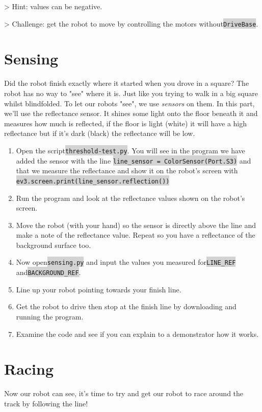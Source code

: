 \documentclass[12pt,a4paper]{article}
\newcommand{\code}[1]{\colorbox{lightgray}{\texttt{#1}}}
\begin{document}
> Hint: values can be negative.

> Challenge: get the robot to move by controlling the motors without\code{DriveBase}.

\section{ Sensing}

Did the robot finish exactly where it started when you drove in a square? The robot has no way to "see" where it is. Just like you trying to walk in a big square whilst blindfolded. To let our robots "see", we use \emph{sensors} on them. In this part, we'll use the reflectance sensor. It shines some light onto the floor beneath it and measures how much is reflected, if the floor is light (white) it will have a high reflectance but if it's dark (black) the reflectance will be low.

\begin{enumerate}
    \item Open the script\code{threshold-test.py}. You will see in the program we have added the sensor with the line  
    \code{line\_sensor = ColorSensor(Port.S3)}
    and that we measure the reflectance and show it on the robot's screen with
    \code{ev3.screen.print(line\_sensor.reflection())}
    \item Run the program and look at the reflectance values shown on the robot's screen. 
    \item Move the robot (with your hand) so the sensor is directly above the line and make a note of the reflectance value. Repeat so you have a reflectance of the background surface too. 
    \item Now open\code{sensing.py} and input the values you measured for\code{LINE\_REF} and\code{BACKGROUND\_REF}. 
    \item Line up your robot pointing towards your finish line. 
    \item Get the robot to drive then stop at the finish line by downloading and running the program. 
    \item Examine the code and see if you can explain to a demonstrator how it works. 
\end{enumerate}

\section{ Racing}
Now our robot can see, it's time to try and get our robot to race around the track by following the line!
\end{document}
